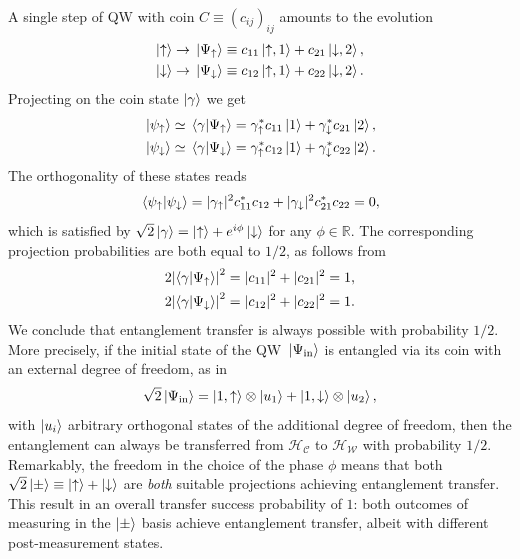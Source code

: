 \documentclass[
	aps, pra,
	superscriptaddress, twocolumn,
	floatfix,
	10pt
]{revtex4-1}
\newcommand{\on}[1]{\operatorname{#1}}
\newcommand{\parTitle}[1]{\noindent{\color{Mahogany}(\emph{#1})}}
\newcommand{\RR}{\mathbb{R}}
\newcommand{\calC}{{\mathcal{C}}}
\newcommand{\calH}{{\mathcal{H}}}
\newcommand{\calW}{{\mathcal{W}}}
\begin{document}
\parTitle{Single step}
A single step of QW with coin $C\equiv (c_{ij})_{ij}$ amounts to the evolution
\begin{equation}
\begin{aligned}
	\ket\uparrow&\rightarrow \ket*{\Psi_\uparrow} \equiv c_{11}\ket{\uparrow,1} + c_{21}\ket{\downarrow,2}, \\
	\ket\downarrow&\rightarrow \ket*{\Psi_\downarrow} \equiv c_{12}\ket{\uparrow,1} + c_{22}\ket{\downarrow,2}.
\end{aligned}
\end{equation}
Projecting on the coin state $\ket\gamma$ we get
\begin{equation}
\begin{aligned}
	\ket*{\psi_\uparrow} \simeq \braket*{\gamma}{\Psi_\uparrow} &= \gamma_\uparrow^*c_{11}\ket1 + \gamma_\downarrow^* c_{21}\ket2, \\
	\ket*{\psi_\downarrow} \simeq \braket*{\gamma}{\Psi_\downarrow} &= \gamma_\uparrow^* c_{12} \ket1 + \gamma_\downarrow^* c_{22} \ket2.
\end{aligned}
\end{equation}
The orthogonality of these states reads
\begin{equation}
\begin{gathered}
	\braket*{\psi_\uparrow}{\psi_\downarrow}
	= |\gamma_\uparrow|^2 c_{11}^* c_{12} + |\gamma_\downarrow|^2 c_{21}^* c_{22} = 0,
\end{gathered}
\end{equation}
which is satisfied by $\sqrt2\ket\gamma = \ket\uparrow + e^{i\phi}\ket\downarrow$ for any $\phi\in\RR$.
The corresponding projection probabilities are both equal to $1/2$, as follows from
\begin{equation}
\begin{aligned}
	2\abs{\braket{\gamma}{\Psi_\uparrow}}^2 &= |c_{11}|^2 + |c_{21}|^2 = 1, \\
	2\abs{\braket{\gamma}{\Psi_\downarrow}}^2 &= |c_{12}|^2 + |c_{22}|^2 = 1.
\end{aligned}
\end{equation}
We conclude that entanglement transfer is always possible with probability $1/2$.
More precisely, if the initial state of the QW $\ket*{\Psi_{\on{in}}}$ is entangled via its coin with an external degree of freedom, as in
\begin{equation}
	\sqrt2\ket*{\Psi_{\on{in}}} = \ket{1,\uparrow} \otimes \ket{u_1} + \ket{1,\downarrow}\otimes \ket{u_2},
\end{equation}
with $\ket{u_i}$ arbitrary orthogonal states of the additional degree of freedom,
then the entanglement can always be transferred from $\calH_{\calC}$ to $\calH_{\calW}$ with probability $1/2$.
Remarkably, the freedom in the choice of the phase $\phi$ means that both $\sqrt2\ket\pm\equiv \ket\uparrow+\ket\downarrow$ are \emph{both} suitable projections achieving entanglement transfer.
This result in an overall transfer success probability of $1$: both outcomes of measuring in the $\ket\pm$ basis achieve entanglement transfer, albeit with different post-measurement states.
\end{document}
